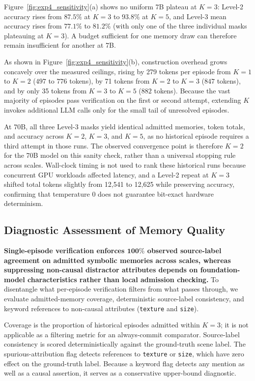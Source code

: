 \documentclass[10pt,a4paper,onecolumn]{article}
\theoremstyle{definition}
\theoremstyle{remark}
\begin{document}
Figure~\ref{fig:exp4_sensitivity}(a) shows no uniform 7B plateau at $K=3$: Level-2 accuracy rises from $87.5\%$ at $K=3$ to $93.8\%$ at $K=5$, and Level-3 mean accuracy rises from $77.1\%$ to $81.2\%$ (with only one of the three individual masks plateauing at $K=3$). A budget sufficient for one memory draw can therefore remain insufficient for another at 7B.

As shown in Figure~\ref{fig:exp4_sensitivity}(b), construction overhead grows concavely over the measured ceilings, rising by 279 tokens per episode from $K=1$ to $K=2$ ($497$ to $776$ tokens), by 71 tokens from $K=2$ to $K=3$ ($847$ tokens), and by only 35 tokens from $K=3$ to $K=5$ ($882$ tokens). Because the vast majority of episodes pass verification on the first or second attempt, extending $K$ invokes additional LLM calls only for the small tail of unresolved episodes.

At 70B, all three Level-3 masks yield identical admitted memories, token totals, and accuracy across $K=2$, $K=3$, and $K=5$, as no historical episode requires a third attempt in those runs. The observed convergence point is therefore $K=2$ for the 70B model on this sanity check, rather than a universal stopping rule across scales. Wall-clock timing is not used to rank these historical runs because concurrent GPU workloads affected latency, and a Level-2 repeat at $K=3$ shifted total tokens slightly from 12,541 to 12,625 while preserving accuracy, confirming that temperature $0$ does not guarantee bit-exact hardware determinism.

\subsection{Diagnostic Assessment of Memory Quality}
\label{sec:exp5}
\textbf{Single-episode verification enforces $\boldsymbol{100\%}$ observed source-label agreement on admitted symbolic memories across scales, whereas suppressing non-causal distractor attributes depends on foundation-model characteristics rather than local admission checking.} To disentangle what per-episode verification filters from what passes through, we evaluate admitted-memory coverage, deterministic source-label consistency, and keyword references to non-causal attributes (\texttt{texture} and \texttt{size}).

Coverage is the proportion of historical episodes admitted within $K=3$; it is not applicable as a filtering metric for an always-commit comparator. Source-label consistency is scored deterministically against the ground-truth scene label. The spurious-attribution flag detects references to \texttt{texture} or \texttt{size}, which have zero effect on the ground-truth label. Because a keyword flag detects any mention as well as a causal assertion, it serves as a conservative upper-bound diagnostic.
\end{document}
